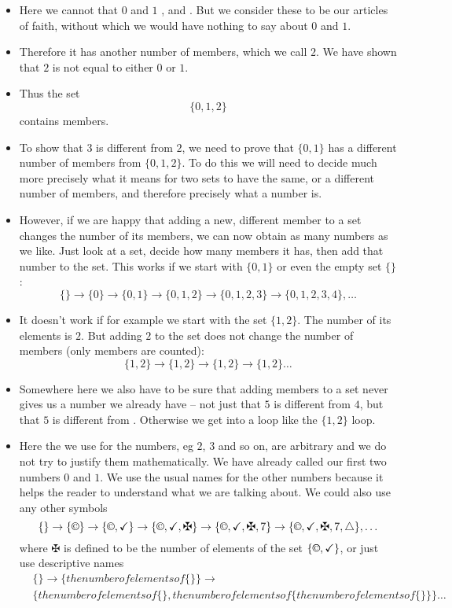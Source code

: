 \begin{itemize}
\item
Here we cannot  that $0$ and $1$ , and . But we consider these to be our articles of faith, without which we would have nothing to say about $0$ and $1$.
\item
Therefore it has another number of members, which we call $2$. We have shown that $2$ is not equal to either $0$ or $1$.
\item
Thus the set \[\{0, 1, 2\}\] contains  members. 
\item
To show that $3$ is different from $2$, we need to prove that $\{0,1\}$ has a different number of members from $\{0,1,2\}$. To do this we will need to decide much more precisely what it means for two sets to have the same, or a different number of members, and therefore precisely what a number is.
\item
However, if we are happy that adding a new, different member to a set changes the number of its members, we can now obtain as many numbers as we like. Just look at a set, decide how many members it has, then add that number to the set. This works if we start with $\{0,1\}$ or even the empty set $\{\}$:
\[ \{\} \rightarrow \{0\} \rightarrow \{0,1\} \rightarrow \{0,1,2\} \rightarrow \{0,1,2,3\} \rightarrow \{0,1,2,3,4\}, \ldots \]
\item
It doesn't work if for example we start with the set $\{1,2\}$. The number of its elements is $2$. But adding $2$ to the set does not change the number of members (only  members are counted):
\[ \{1,2\} \rightarrow \{1,2\} \rightarrow \{1,2\} \rightarrow \{1,2\} \ldots \]
\item
Somewhere here we also have to be sure that adding members to a set never gives us a number we already have -- not just that $5$ is different from $4$, but that $5$ is different from . Otherwise we get into a loop like the $\{1,2\}$ loop.
\item
Here the  we use for the numbers, eg $2$, $3$ and so on, are arbitrary and we do not try to justify them mathematically. We have already called our first two numbers $0$ and $1$. We use the usual names for the other numbers because it helps the reader to understand what we are talking about. We could also use any other symbols 
\[ \{\} \rightarrow \{\copyright\} \rightarrow \{\copyright,\checkmark\} \rightarrow \{\copyright, \checkmark, \maltese\} \rightarrow \{\copyright, \checkmark, \maltese,7\} \rightarrow \{\copyright, \checkmark, \maltese,7,\bigtriangleup\}, \ldots \]
where $\maltese$ is defined to be the number of elements of the set $\{\copyright, \checkmark\}$,
or just use descriptive names
\begin{align*}
&\{\} \rightarrow \{the number of elements of \{\}\} \rightarrow \\
&\{the number of elements of \{\}, the number of elements of \{the number of elements of \{\}\}\} \ldots 
\end{align*}
\end{itemize}

\theendnotes
